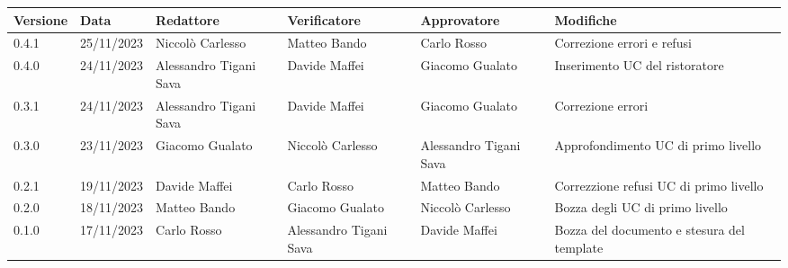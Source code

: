 \begin{table}[H]
	\centering
	\fontsize{10}{12}\selectfont
	\begin{tabularx}{\textwidth}{X|X|X|X|X|X}
		\textbf{Versione}     & \textbf{Data}        & \textbf{Redattore} &
		\textbf{Verificatore} & \textbf{Approvatore} & \textbf{Modifiche}                                      \\
		\toprule
		0.4.1                 & 25/11/2023          & Niccolò Carlesso   & Matteo Bando            & Carlo Rosso                 & Correzione errori e refusi    \\
		\hline
		0.4.0                 & 24/11/2023          & Alessandro Tigani Sava   & Davide Maffei            & Giacomo Gualato                 & Inserimento UC del ristoratore    \\
		\hline
		0.3.1                 & 24/11/2023          & Alessandro Tigani Sava   & Davide Maffei            & Giacomo Gualato                 & Correzione errori    \\
		\hline
		0.3.0                 & 23/11/2023          & Giacomo Gualato   & Niccolò Carlesso             & Alessandro Tigani Sava                 & Approfondimento UC di primo livello    \\
		\hline
		0.2.1                 & 19/11/2023          & Davide Maffei     & Carlo Rosso             & Matteo Bando                 & Correzzione refusi UC di primo livello    \\
		\hline
		0.2.0                 & 18/11/2023          & Matteo Bando      & Giacomo Gualato         & Niccolò Carlesso             & Bozza degli UC di primo livello    \\
		\hline
		0.1.0                 & 17/11/2023          & Carlo Rosso       & Alessandro Tigani Sava  & Davide Maffei                & Bozza del documento e stesura del template    \\
		\bottomrule
	\end{tabularx}
\end{table}
